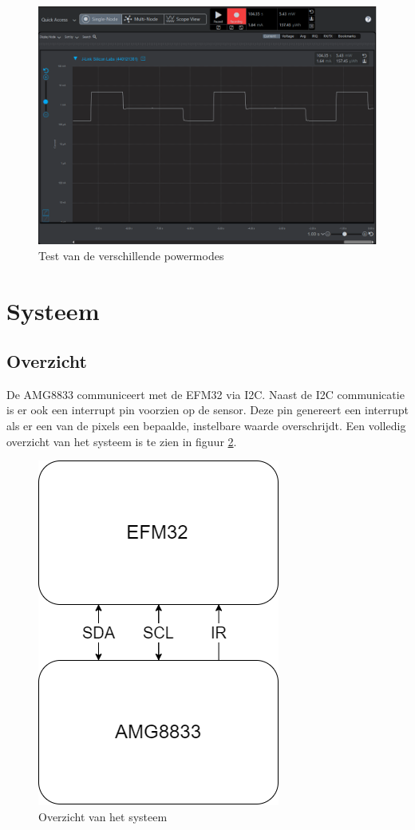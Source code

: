 \documentclass[]{article}
\begin{document}

\begin{figure}[!ht]
	\centering
	\includegraphics[width=\columnwidth]{power_modes_cycle_AMG8833_em2.png}
	\caption{Test van de verschillende powermodes}
	\label{fig:powertest}
\end{figure}

\section{Systeem}
\subsection{Overzicht}
De AMG8833 communiceert met de EFM32 via I2C. Naast de I2C communicatie is er ook een interrupt pin voorzien op de sensor. Deze pin genereert een interrupt als er een van de pixels een bepaalde, instelbare waarde overschrijdt. Een volledig overzicht van het systeem is te zien in figuur \ref{fig:systeem}.

\begin{figure}[!ht]
	\centering
	\includegraphics[scale=0.5]{sys.png}
	\caption{Overzicht van het systeem}
	\label{fig:systeem}
\end{figure}
\end{document}

